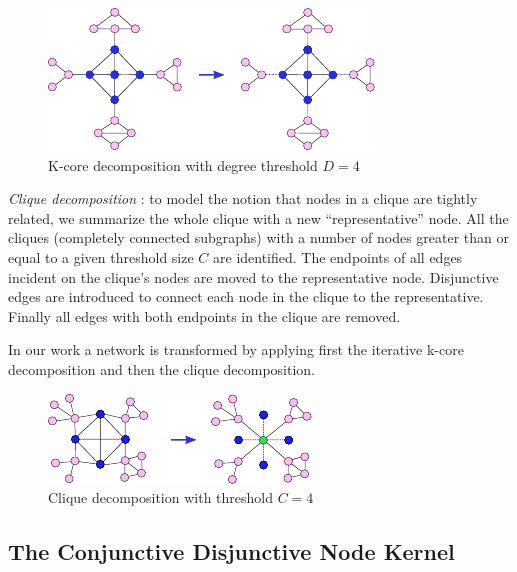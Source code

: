 \documentclass[review]{elsarticle}
\begin{document}
\begin{figure}
\centering
\includegraphics[width=.9\textwidth]{k_core}
\caption{K-core decomposition with degree threshold $D = 4$}
\label{fig:kcore-decomposition}
\end{figure}

\textit{Clique decomposition} \cite{tarjan1985decomposition}: to model the notion that nodes in a clique are tightly related, we summarize the whole clique with a new ``representative'' node. All the cliques (completely connected subgraphs) with a number of nodes greater than or equal to a given threshold size $C$ are identified. The endpoints of all edges incident on the clique's nodes are moved to the representative node. Disjunctive edges are introduced to connect each node in the clique to the representative. Finally all edges with both endpoints in the clique are removed.

In our work a network is transformed by applying first the iterative k-core decomposition and then the clique decomposition.

\begin{figure}
\centering
\includegraphics[width=.9\textwidth]{cliques}
\caption{Clique decomposition with threshold $C = 4$}
\label{fig:clique-decomposition}
\end{figure}

\subsection{The Conjunctive Disjunctive Node Kernel}
\end{document}
